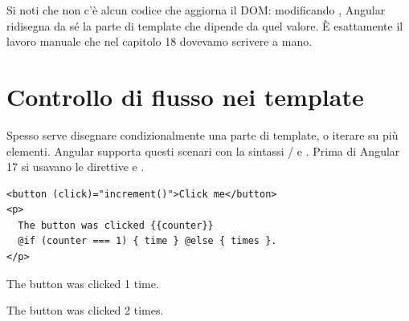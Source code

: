 Si noti che non c'è alcun codice che aggiorna il DOM: modificando
, Angular ridisegna da sé la parte di template che dipende da
quel valore. È esattamente il lavoro manuale che nel capitolo 18 dovevamo
scrivere a mano.

\section{Controllo di flusso nei template}

Spesso serve disegnare condizionalmente una parte di template, o iterare su più
elementi. Angular supporta questi scenari con la sintassi /
e . Prima di Angular 17 si usavano le direttive  e
.

\begin{affianco}[0.46][c]
\begin{lstlisting}[style=html, name=counter.component.html]
<button (click)="increment()">Click me</button>
<p>
  The button was clicked {{counter}}
  @if (counter === 1) { time } @else { times }.
</p>
\end{lstlisting}
\risultato
\begin{browser}[counter = 1]
  \par\vspace{4pt}
  {\Lato\large The button was clicked 1 time.\par}
\end{browser}
\begin{browser}[counter = 2]
  \par\vspace{4pt}
  {\Lato\large The button was clicked 2 times.\par}
\end{browser}
\end{affianco}

